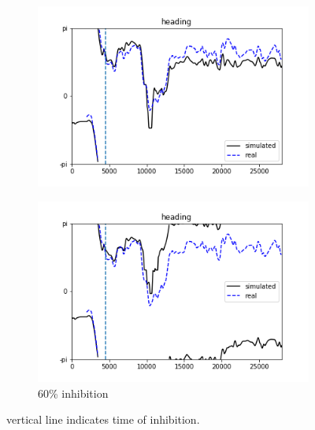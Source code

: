 \documentclass{article}
\begin{document}
\begin{figure}[h]
	\centering
	\begin{subfigure}[t]{0.48\linewidth}
		\centering
		\includegraphics[width = 1.0\linewidth, trim={0 0 0 0}, clip=true]{../figures/sim_head_D7_07.png}
		\label{fig:F}	
	\end{subfigure}
	\hspace{0.01\linewidth}
	\begin{subfigure}[t]{0.48\linewidth}
		\centering
		\includegraphics[width = 1.0\linewidth, trim={0 0 0 0}, clip=true]{../figures/sim_head_D7_04.png}
		\caption{60\% inhibition}
		\label{fig:dF}
	\end{subfigure}
\caption{vertical line indicates time of inhibition.}
\label{fig:fit}
\end{figure}
\end{document}
